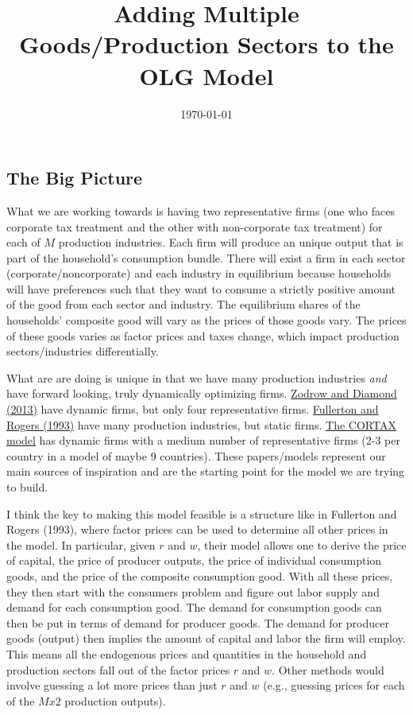 \documentclass[letterpaper,12pt]{article}
\theoremstyle{definition}
\begin{document}
\title{Adding Multiple Goods/Production Sectors to the OLG Model}
\date{\today}
\author{}
\maketitle

\begin{spacing}{1.5}


\section*{The Big Picture}

What we are working towards is having two representative firms (one who faces corporate tax treatment and the other with non-corporate tax treatment) for each of $M$ production industries.  Each firm will produce an unique output that is part of the household's consumption bundle.  There will exist a firm in each sector (corporate/noncorporate) and each industry in equilibrium because households will have preferences such that they want to consume a strictly positive amount of the good from each sector and industry.  The equilibrium shares of the households' composite good will vary as the prices of those goods vary.  The prices of these goods varies as factor prices and taxes change, which impact production sectors/industries differentially.

What are are doing is unique in that we have many production industries \emph{and} have forward looking, truly dynamically optimizing firms.  \href{https://github.com/OpenSourcePolicyCenter/dynamic/blob/master/Papers/ZodrowDiamond2013.pdf}{Zodrow and Diamond (2013)} have dynamic firms, but only four representative firms.  \href{https://github.com/OpenSourcePolicyCenter/dynamic/blob/master/Papers/FullertonRogers1993.pdf}{Fullerton and Rogers (1993)} have many production industries, but static firms.  \href{https://github.com/OpenSourcePolicyCenter/dynamic/blob/master/Papers/memo161.pdf}{The CORTAX model} has dynamic firms with a medium number of representative firms (2-3 per country in a model of maybe 9 countries).  These papers/models represent our main sources of inspiration and are the starting point for the model we are trying to build.

I think the key to making this model feasible is a structure like in Fullerton and Rogers (1993), where factor prices can be used to determine all other prices in the model.  In particular, given $r$ and $w$, their model allows one to derive the price of capital, the price of producer outputs, the price of individual consumption goods, and the price of the composite consumption good.  With all these prices, they then start with the consumers problem and figure out labor supply and demand for each consumption good.  The demand for consumption goods can then be put in terms of demand for producer goods.  The demand for producer goods (output) then implies the amount of capital and labor the firm will employ.  This means all the endogenous prices and quantities in the household and production sectors fall out of the factor prices $r$ and $w$.  Other methods would involve guessing a lot more prices than just $r$ and $w$ (e.g., guessing prices for each of the $Mx2$ production outputs).


\end{spacing}
\end{document}
